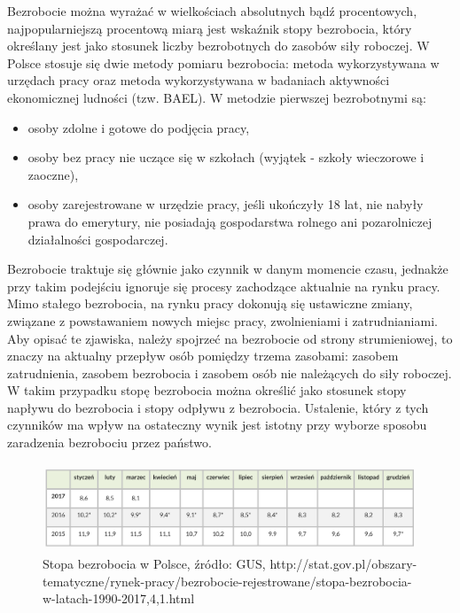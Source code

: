 \documentclass[12pt]{extarticle}
\begin{document}
Bezrobocie można wyrażać w wielkościach absolutnych bądź procentowych, najpopularniejszą procentową miarą jest wskaźnik stopy bezrobocia, który określany jest jako stosunek liczby bezrobotnych do zasobów siły roboczej. W Polsce stosuje się dwie metody pomiaru bezrobocia: metoda wykorzystywana w urzędach pracy oraz metoda wykorzystywana w badaniach aktywności ekonomicznej ludności (tzw. BAEL). W metodzie pierwszej bezrobotnymi są:

\begin{itemize}
	\item osoby zdolne i gotowe do podjęcia pracy,
    \item osoby bez pracy nie uczące się w szkołach (wyjątek - szkoły wieczorowe i zaoczne),
	\item osoby zarejestrowane w urzędzie pracy, jeśli ukończyły 18 lat, nie nabyły prawa do emerytury, nie posiadają gospodarstwa rolnego ani pozarolniczej działalności gospodarczej.
\end{itemize}

Bezrobocie traktuje się głównie jako czynnik w danym momencie czasu, jednakże przy takim podejściu ignoruje się procesy zachodzące aktualnie na rynku pracy. Mimo stałego bezrobocia, na rynku pracy dokonują się ustawiczne zmiany, związane z powstawaniem nowych miejsc pracy, zwolnieniami i zatrudnianiami. Aby opisać te zjawiska, należy spojrzeć na bezrobocie od strony strumieniowej, to znaczy na aktualny przepływ osób pomiędzy trzema zasobami: zasobem zatrudnienia, zasobem bezrobocia i zasobem osób nie należących do siły roboczej. W takim przypadku stopę bezrobocia można określić jako stosunek stopy napływu do bezrobocia i stopy odpływu z bezrobocia. Ustalenie, który z tych czynników ma wpływ na ostateczny wynik jest istotny przy wyborze sposobu zaradzenia bezrobociu przez państwo.

\begin{figure}[H]
\centering
\includegraphics[width=15cm]{bezrobocie_polska}
    \caption{Stopa bezrobocia w Polsce, źródło: GUS, http://stat.gov.pl/obszary-tematyczne/rynek-pracy/bezrobocie-rejestrowane/stopa-bezrobocia-w-latach-1990-2017,4,1.html}
\end{figure}
\end{document}
